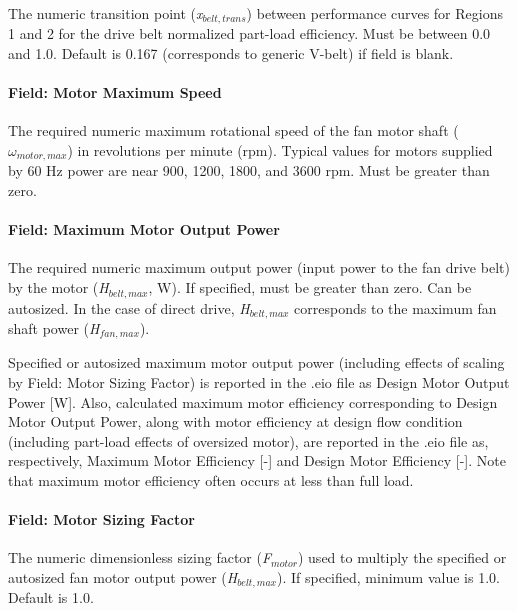 The numeric transition point (\emph{x\(_{belt,trans}\)}) between performance curves for Regions 1 and 2 for the drive belt normalized part-load efficiency. Must be between 0.0 and 1.0. Default is 0.167 (corresponds to generic V-belt) if field is blank.

\paragraph{Field: Motor Maximum Speed}\label{field-motor-maximum-speed}

The required numeric maximum rotational speed of the fan motor shaft (\(\omega_{motor,max}\)) in revolutions per minute (rpm). Typical values for motors supplied by 60 Hz power are near 900, 1200, 1800, and 3600 rpm. Must be greater than zero.

\paragraph{Field: Maximum Motor Output Power}\label{field-maximum-motor-output-power}

The required numeric maximum output power (input power to the fan drive belt) by the motor (\emph{H\(_{belt,max}\)}, W). If specified, must be greater than zero. Can be autosized. In the case of direct drive, \emph{H\(_{belt,max}\)} corresponds to the maximum fan shaft power (\emph{H\(_{fan,max}\)}).

Specified or autosized maximum motor output power (including effects of scaling by Field: Motor Sizing Factor) is reported in the .eio file as Design Motor Output Power {[}W{]}. Also, calculated maximum motor efficiency corresponding to Design Motor Output Power, along with motor efficiency at design flow condition (including part-load effects of oversized motor), are reported in the .eio file as, respectively, Maximum Motor Efficiency {[}-{]} and Design Motor Efficiency {[}-{]}. Note that maximum motor efficiency often occurs at less than full load.

\paragraph{Field: Motor Sizing Factor}\label{field-motor-sizing-factor}

The numeric dimensionless sizing factor (\emph{F\(_{motor}\)}) used to multiply the specified or autosized fan motor output power (\emph{H\(_{belt,max}\)}). If specified, minimum value is 1.0. Default is 1.0.

